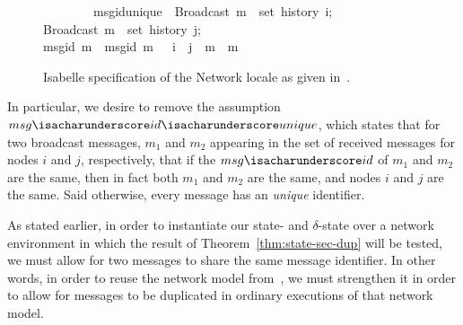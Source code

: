 \begin{figure}[H]
\begin{isabelle}
~~~~~~~~\>msg{\isacharunderscore}id{\isacharunderscore}unique{\isacharcolon}\ \>{\isasymlbrakk}\ \>{\isachardoublequoteopen}Broadcast\ m{}\ {\isasymin}\ set\ {\isacharparenleft}history\ i{\isacharparenright};\\
\>\>\>Broadcast\ m{}\ {\isasymin}\ set\ {\isacharparenleft}history\ j{\isacharparenright};\\
\>\>\>msg{\isacharunderscore}id\ m{}\ {\isacharequal}\ msg{\isacharunderscore}id\ m{}\ \>{\isasymrbrakk}\ {\isasymLongrightarrow}\ i\ {\isacharequal}\ j\ {\isasymand}\ m{}\ {\isacharequal}\ m{}{\isachardoublequoteclose}
\end{isabelle}
\centering
\caption{Isabelle specification of the Network locale as given
  in~\citep{gomes17}.}
\end{figure}

In particular, we desire to remove the assumption
$msg{\isacharunderscore}id{\isacharunderscore}unique$, which states that for two
broadcast messages, $m_1$ and $m_2$ appearing in the set of received messages
for nodes $i$ and $j$, respectively, that if the $msg{\isacharunderscore}id$ of
$m_1$ and $m_2$ are the same, then in fact both $m_1$ and $m_2$ are the same,
and nodes $i$ and $j$ are the same. Said otherwise, every message has an
\emph{unique} identifier.

As stated earlier, in order to instantiate our state- and $\delta$-state \CRDTs
over a network environment in which the result of
Theorem~\ref{thm:state-sec-dup} will be tested, we must allow for two messages
to share the same message identifier. In other words, in order to reuse the
network model from~\citep{gomes17}, we must strengthen it in order to allow for
messages to be duplicated in ordinary executions of that network model.

